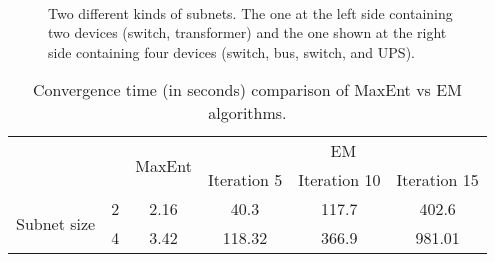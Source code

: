 \begin{table}[!p]
\end{table}

\begin{figure}[!p]
\centering \vspace{2cm}
	\subfloat{\texttt{[image: s1]}}\\ \vspace{1cm}
	\subfloat{\texttt{[image: s2]}}
\caption{Two different kinds of subnets. The one at the left side containing two devices (switch, transformer) and the one shown at the right side containing four devices (switch, bus, switch, and UPS).} \label{fig:twosubnets} \vspace{2cm}
\end{figure}

\begin{table}[!p]
\renewcommand{\tabcolsep}{0.5 cm}
\renewcommand*{\arraystretch}{2}
\centering \caption{Convergence time (in seconds) comparison of MaxEnt vs EM algorithms.}
\begin{tabular}{|c|c|c|c|c|c|}
 \hline \multicolumn{2}{|c|}{\multirow{2}{*}{}} & \multirow{2}{*}{MaxEnt} & \multicolumn{3}{c|}{EM}\\
\cline{4-6}
\multicolumn{2}{|c|}{} & & Iteration 5 & Iteration 10 & Iteration 15\\
\hline
\multirow{2}{*}{Subnet size} & 2 & 2.16 & 40.3 & 117.7 & 402.6\\
\cline{2-6}
& 4 & 3.42 & 118.32 & 366.9 & 981.01\\
\hline
\end{tabular}
\label{tbl:eval_t}
\end{table}


